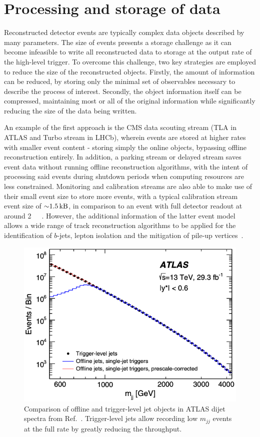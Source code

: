 \section{Processing and storage of data}
\label{sec:data}

Reconstructed detector events are typically complex data objects described by many parameters. The size of events presents a storage challenge as it can become infeasible to write all reconstructed data to storage at the output rate of the high-level trigger. To overcome this challenge, two key strategies are employed to reduce the size of the reconstructed objects. Firstly, the amount of information can be reduced, by storing only the minimal set of observables necessary to describe the process of interest. Secondly, the object information itself can be compressed, maintaining most or all of the original information while significantly reducing the size of the data being written.

An example of the first approach is the CMS data scouting stream (TLA in ATLAS and Turbo stream in LHCb), wherein events are stored at higher rates with smaller event content - storing simply the online objects, bypassing offline reconstruction entirely. In addition, a parking stream or delayed stream saves event data without running offline reconstruction algorithms, with the intent of processing said events during shutdown periods when computing resources are less constrained. Monitoring and calibration streams are also able to make use of their small event size to store more events, with a typical calibration stream event size of ${\sim}\SI{1.5}{\kilo\byte}$, in comparison to an event with full detector readout at around \SI{2}{\mega\byte}~\cite{cms2023development}. However, the additional information of the latter event model allows a wide range of track reconstruction algorithms to be applied for the identification of $b$-jets, lepton isolation and the mitigation of pile-up vertices~\cite{mia2014trackingcms,tosi2016trackingcms}. 

\begin{figure}[h!]
    \centering
    \includegraphics[width=0.55\linewidth]{images/atlas/ATLAS-TLA.png}
    \caption{Comparison of offline and trigger-level jet objects in ATLAS dijet spectra from Ref.~\cite{ATLAS:2018qto}. Trigger-level jets allow recording low $m_{jj}$ events at the full rate by greatly reducing the throughput.}
    \label{fig:trigger-level-efficiencies}
\end{figure}

